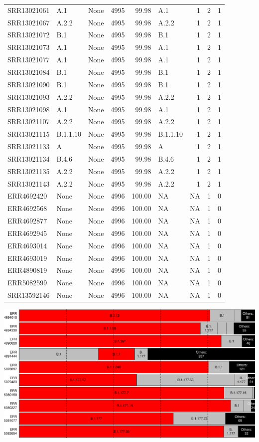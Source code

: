 \documentclass[
]{article}
\begin{document}
\begin{longtable}[]{@{}lllrrlrrr@{}}
SRR13021061 & A.1 & None & 4995 & 99.98 & A.1 & 1 & 2 & 1\tabularnewline
SRR13021067 & A.2.2 & None & 4995 & 99.98 & A.2.2 & 1 & 2 &
1\tabularnewline
SRR13021072 & B.1 & None & 4995 & 99.98 & B.1 & 1 & 2 & 1\tabularnewline
SRR13021073 & A.1 & None & 4995 & 99.98 & A.1 & 1 & 2 & 1\tabularnewline
SRR13021077 & A.1 & None & 4995 & 99.98 & A.1 & 1 & 2 & 1\tabularnewline
SRR13021084 & B.1 & None & 4995 & 99.98 & B.1 & 1 & 2 & 1\tabularnewline
SRR13021090 & B.1 & None & 4995 & 99.98 & B.1 & 1 & 2 & 1\tabularnewline
SRR13021093 & A.2.2 & None & 4995 & 99.98 & A.2.2 & 1 & 2 &
1\tabularnewline
SRR13021098 & A.1 & None & 4995 & 99.98 & A.1 & 1 & 2 & 1\tabularnewline
SRR13021107 & A.2.2 & None & 4995 & 99.98 & A.2.2 & 1 & 2 &
1\tabularnewline
SRR13021115 & B.1.1.10 & None & 4995 & 99.98 & B.1.1.10 & 1 & 2 &
1\tabularnewline
SRR13021133 & A & None & 4995 & 99.98 & A & 1 & 2 & 1\tabularnewline
SRR13021134 & B.4.6 & None & 4995 & 99.98 & B.4.6 & 1 & 2 &
1\tabularnewline
SRR13021135 & A.2.2 & None & 4995 & 99.98 & A.2.2 & 1 & 2 &
1\tabularnewline
SRR13021143 & A.2.2 & None & 4995 & 99.98 & A.2.2 & 1 & 2 &
1\tabularnewline
ERR4692420 & None & None & 4996 & 100.00 & NA & NA & 1 &
0\tabularnewline
ERR4692568 & None & None & 4996 & 100.00 & NA & NA & 1 &
0\tabularnewline
ERR4692877 & None & None & 4996 & 100.00 & NA & NA & 1 &
0\tabularnewline
ERR4692945 & None & None & 4996 & 100.00 & NA & NA & 1 &
0\tabularnewline
ERR4693014 & None & None & 4996 & 100.00 & NA & NA & 1 &
0\tabularnewline
ERR4693019 & None & None & 4996 & 100.00 & NA & NA & 1 &
0\tabularnewline
ERR4890819 & None & None & 4996 & 100.00 & NA & NA & 1 &
0\tabularnewline
ERR5082599 & None & None & 4996 & 100.00 & NA & NA & 1 &
0\tabularnewline
SRR13592146 & None & None & 4996 & 100.00 & NA & NA & 1 &
0\tabularnewline
\bottomrule
\end{longtable}

\includegraphics{pangolin_results_report_files/figure-latex/pareto-1.pdf}
\end{document}
